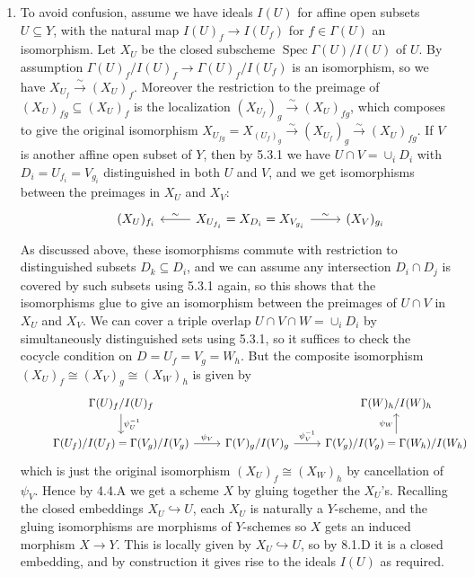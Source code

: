 \documentclass{report}
\DeclareMathOperator{\Spec}{Spec}
\begin{document}
\begin{enumerate}[label=\textbf{8.1.\Alph*.}]
	\item To avoid confusion, assume we have ideals $I(U)$ for affine open
	      subsets $U\subseteq Y$, with the natural map $I(U)_f\to I(U_f)$ for
	      $f\in\Gamma(U)$ an isomorphism. Let $X_U$ be the closed subscheme
	      $\Spec\Gamma(U)/I(U)$ of $U$. By assumption
	      $\Gamma(U)_f/I(U)_f\to\Gamma(U)_f/I(U_f)$ is an isomorphism, so we have
	      $X_{U_f}\xrightarrow\sim(X_U)_f$. Moreover the restriction to the
	      preimage of $(X_U)_{fg}\subseteq(X_U)_f$ is the localization
	      $(X_{U_f})_g\xrightarrow\sim(X_U)_{fg}$, which composes to give the
	      original isomorphism
	      $X_{U_{fg}}=X_{(U_f)_g}\xrightarrow\sim(X_{U_f})_g\xrightarrow\sim(X_U)_{fg}$.
	      If $V$ is another affine open subset of $Y$, then by 5.3.1 we have
	      $U\cap V=\cup_iD_i$ with $D_i=U_{f_i}=V_{g_i}$ distinguished in both $U$
	      and $V$, and we get isomorphisms between the preimages in $X_U$ and
	      $X_V$:
	      \begin{equation*}
		      \begin{tikzcd}
			      &(X_U)_{f_i}
			      &X_{U_{f_i}} = X_{D_i} = X_{V_{g_i}}
			      \ar[l,swap,"\sim"] \ar[r,"\sim"]
			      &(X_V)_{g_i}
		      \end{tikzcd}
	      \end{equation*}
	      As discussed above, these isomorphisms commute with restriction to
	      distinguished subsets $D_k\subseteq D_i$, and we can assume any
	      intersection $D_i\cap D_j$ is covered by such subsets using 5.3.1 again,
	      so this shows that the isomorphisms glue to give an isomorphism between
	      the preimages of $U\cap V$ in $X_U$ and $X_V$. We can cover a triple
	      overlap $U\cap V\cap W=\cup_iD_i$ by simultaneously distinguished sets
	      using 5.3.1, so it suffices to check the cocycle condition on
	      $D=U_f=V_g=W_h$. But the composite isomorphism
	      $(X_U)_f\cong(X_V)_g\cong(X_W)_h$ is given by
	      \begin{equation*}
		      \begin{tikzcd}
			      &\Gamma(U)_f/I(U)_f \ar[d,"\psi_U^{-1}"]
			      &
			      &\Gamma(W)_h/I(W)_h \\
			      &\Gamma(U_f)/I(U_f) = \Gamma(V_g)/I(V_g) \ar[r,"\psi_V"]
			      &\Gamma(V)_g/I(V)_g \ar[r,"\psi_V^{-1}"]
			      &\Gamma(V_g)/I(V_g) = \Gamma(W_h)/I(W_h) \ar[u,"\psi_W"]
		      \end{tikzcd}
	      \end{equation*}
	      which is just the original isomorphism $(X_U)_f\cong(X_W)_h$ by
	      cancellation of $\psi_V$. Hence by 4.4.A we get a scheme $X$ by gluing
	      together the $X_U$'s. Recalling the closed embeddings
	      $X_U\hookrightarrow U$, each $X_U$ is naturally a $Y$-scheme, and the
	      gluing isomorphisms are morphisms of $Y$-schemes so $X$ gets an induced
	      morphism $X\to Y$. This is locally given by $X_U\hookrightarrow U$, so
	      by 8.1.D it is a closed embedding, and by construction it gives rise to
	      the ideals $I(U)$ as required.


\end{enumerate}
\end{document}
